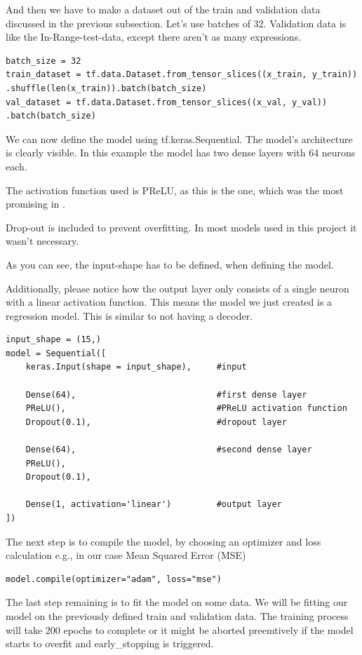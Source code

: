 \documentclass{article}
\begin{document}
And then we have to make a dataset out of the train and validation data 
discussed in the previous subsection. Let's use batches of 32.
Validation data is like the In-Range-test-data, except there aren't as many
expressions.
\begin{Verbatim}
batch_size = 32
train_dataset = tf.data.Dataset.from_tensor_slices((x_train, y_train))
.shuffle(len(x_train)).batch(batch_size)
val_dataset = tf.data.Dataset.from_tensor_slices((x_val, y_val))
.batch(batch_size)
\end{Verbatim}

We can now define the model using tf.keras.Sequential. The model's 
architecture is clearly visible. In this example the model has two dense 
layers with 64 neurons each.

The activation function used is PReLU, as this is the one, which was the  
most promising in \cite{trask2018neuralarithmeticlogicunits}. 

Drop-out is included to prevent overfitting. In most models used in this 
project it wasn't necessary.

As you can see, the input-shape has to be defined, when defining the model.

Additionally, please notice how the output layer only consists of a single 
neuron with a linear activation function. This means the model we just 
created is a regression model. This is similar to not having a decoder.
\begin{Verbatim}
input_shape = (15,)
model = Sequential([
    keras.Input(shape = input_shape),     #input

    Dense(64),                            #first dense layer
    PReLU(),                              #PReLU activation function
    Dropout(0.1),                         #dropout layer

    Dense(64),                            #second dense layer
    PReLU(),                                
    Dropout(0.1),                           

    Dense(1, activation='linear')         #output layer
])
\end{Verbatim}

The next step is to compile the model, by choosing an optimizer and loss 
calculation e.g., in our case Mean Squared Error (MSE)
\begin{Verbatim}
model.compile(optimizer="adam", loss="mse")
\end{Verbatim}

The last step remaining is to fit the model on some data. We will be 
fitting our model on the previously defined train and validation data. 
The training process will take 200 epochs to complete or it might be aborted
preemtively if the model starts to overfit and early\_stopping is triggered.
\end{document}
